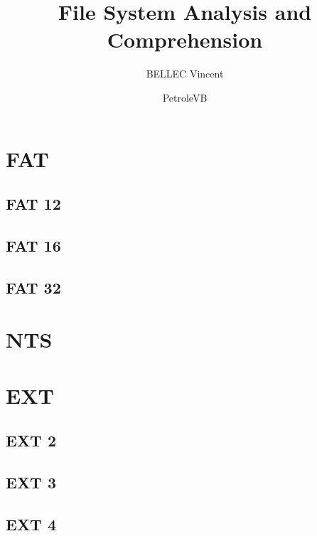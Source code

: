 \documentclass[11pt]{report}
\title{File System Analysis and Comprehension}
\author{BELLEC Vincent \and PetroleVB}
\begin{document}
	
	\maketitle
	\tableofcontents

\chapter{FAT}

\section{FAT 12}

\section{FAT 16}

\section{FAT 32}


\chapter{NTS}


\chapter{EXT}

\section{EXT 2}

\section{EXT 3}

\section{EXT 4}
\end{document}
